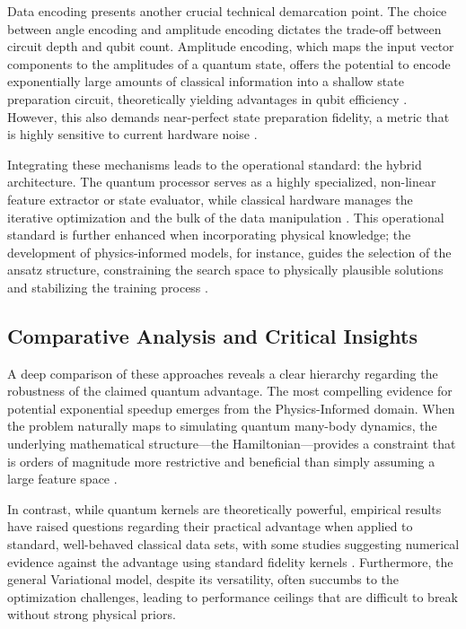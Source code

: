 \documentclass{article}
\begin{document}
Data encoding presents another crucial technical demarcation point. The choice between angle encoding and amplitude encoding dictates the trade-off between circuit depth and qubit count. Amplitude encoding, which maps the input vector components to the amplitudes of a quantum state, offers the potential to encode exponentially large amounts of classical information into a shallow state preparation circuit, theoretically yielding advantages in qubit efficiency \cite{shukla2024efficient}. However, this also demands near-perfect state preparation fidelity, a metric that is highly sensitive to current hardware noise \cite{bharti2021noisy}.

Integrating these mechanisms leads to the operational standard: the hybrid architecture. The quantum processor serves as a highly specialized, non-linear feature extractor or state evaluator, while classical hardware manages the iterative optimization and the bulk of the data manipulation \cite{pulicharla2023hybrid}. This operational standard is further enhanced when incorporating physical knowledge; the development of physics-informed models, for instance, guides the selection of the ansatz structure, constraining the search space to physically plausible solutions and stabilizing the training process \cite{cuomo2022scientific}.

\subsection{Comparative Analysis and Critical Insights}

\label{sec:comparative\_analysis\_and\_critical\_insigh}

A deep comparison of these approaches reveals a clear hierarchy regarding the robustness of the claimed quantum advantage. The most compelling evidence for potential exponential speedup emerges from the Physics-Informed domain. When the problem naturally maps to simulating quantum many-body dynamics, the underlying mathematical structure---the Hamiltonian---provides a constraint that is orders of magnitude more restrictive and beneficial than simply assuming a large feature space \cite{daley2022practical}.

In contrast, while quantum kernels are theoretically powerful, empirical results have raised questions regarding their practical advantage when applied to standard, well-behaved classical data sets, with some studies suggesting numerical evidence against the advantage using standard fidelity kernels \cite{slattery2023numerical}. Furthermore, the general Variational model, despite its versatility, often succumbs to the optimization challenges, leading to performance ceilings that are difficult to break without strong physical priors.
\end{document}
